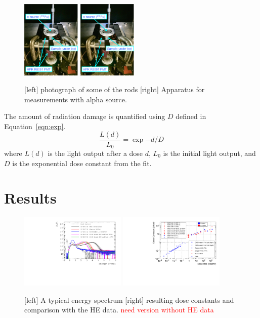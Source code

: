 \documentclass[review]{elsarticle}
\begin{document}
\begin{figure}[hbtp]
\centering
\includegraphics[width=0.25\textwidth]{Setup_AlphaSource.pdf}
\includegraphics[width=0.25\textwidth]{Setup_AlphaSource.pdf}
\caption{
[left] photograph of some of the rods
[right] Apparatus for measurements with alpha source.
}
  \label{fig:hd}
\end{figure}

The amount of radiation damage is quantified 
using $D$ defined in Equation~\ref{eqn:exp}.
\begin{equation}
\frac{L(d)}{L_0}=\exp{-d/D}
\label{eqn:exp}
\end{equation}
where $L(d)$ is the light output after a dose $d$, $L_0$ is the initial light
output, and $D$ is the exponential dose constant from the fit.


\section{Results}


\begin{figure}[hbtp]
\centering
\includegraphics[width=0.45\textwidth]{AlphaSourceMeasurement-EJ200OLD_nominal.pdf}
\includegraphics[width=0.45\textwidth]{DoseConstVsDoseRate}
    \caption{
[left] A typical energy spectrum 
[right] resulting dose constants and comparison with the HE data. \textcolor{red}{need version without HE data}
    }
    \label{fig:GY_more2}
\end{figure}
\end{document}
